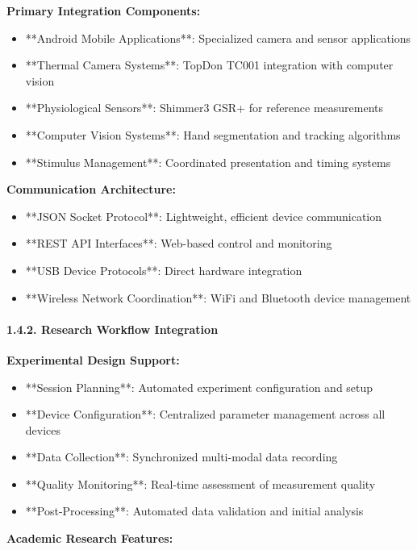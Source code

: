 \documentclass[11pt,a4paper]{article}
\begin{document}
\textbf{Primary Integration Components:}

\begin{itemize}
\item **Android Mobile Applications**: Specialized camera and sensor applications
\item **Thermal Camera Systems**: TopDon TC001 integration with computer vision
\item **Physiological Sensors**: Shimmer3 GSR+ for reference measurements
\item **Computer Vision Systems**: Hand segmentation and tracking algorithms
\item **Stimulus Management**: Coordinated presentation and timing systems

\end{itemize}
\textbf{Communication Architecture:}

\begin{itemize}
\item **JSON Socket Protocol**: Lightweight, efficient device communication
\item **REST API Interfaces**: Web-based control and monitoring
\item **USB Device Protocols**: Direct hardware integration
\item **Wireless Network Coordination**: WiFi and Bluetooth device management

\end{itemize}
\paragraph{1.4.2. Research Workflow Integration}

\textbf{Experimental Design Support:}

\begin{itemize}
\item **Session Planning**: Automated experiment configuration and setup
\item **Device Configuration**: Centralized parameter management across all devices
\item **Data Collection**: Synchronized multi-modal data recording
\item **Quality Monitoring**: Real-time assessment of measurement quality
\item **Post-Processing**: Automated data validation and initial analysis

\end{itemize}
\textbf{Academic Research Features:}
\end{document}
